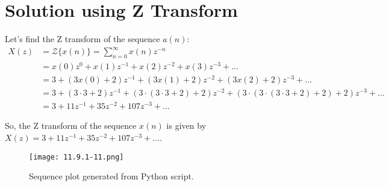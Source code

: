 \documentclass[12pt]{article}
\begin{document}
\section*{Solution using Z Transform}
Let's find the Z transform of the sequence \(a(n)\):
\begin{align*}
X(z) &= \mathcal{Z}\{x(n)\} = \sum_{n=0}^{\infty} x(n)z^{-n} \\
&= x(0)z^0 + x(1)z^{-1} + x(2)z^{-2} + x(3)z^{-3} + \ldots \\
&= 3 + (3x(0) + 2)z^{-1} + (3x(1) + 2)z^{-2} + (3x(2) + 2)z^{-3} + \ldots \\
&= 3 + (3 \cdot 3 + 2)z^{-1} + (3 \cdot (3 \cdot 3 + 2) + 2)z^{-2} + (3 \cdot (3 \cdot (3 \cdot 3 + 2) + 2) + 2)z^{-3} + \ldots \\
&= 3 + 11z^{-1} + 35z^{-2} + 107z^{-3} + \ldots
\end{align*}

So, the Z transform of the sequence \(x(n)\) is given by \(X(z) = 3 + 11z^{-1} + 35z^{-2} + 107z^{-3} + \ldots\).

\begin{figure}[h]
    \centering
    \texttt{[image: 11.9.1-11.png]}
    \caption{Sequence plot generated from Python script.}
    \label{fig:sequence-plot}
\end{figure}
\end{document}
